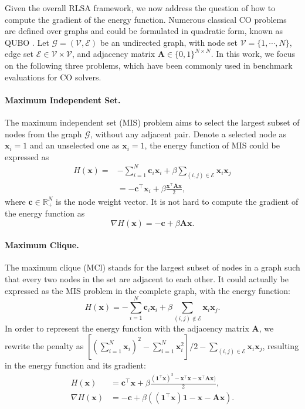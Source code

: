 Given the overall RLSA framework,  we now address the question of how to compute the gradient of the energy function. Numerous classical CO problems are defined over graphs and could be formulated in quadratic form, known as QUBO \citep{10.3389/fphy.2014.00005}. Let $\mathcal{G}=(\mathcal{V}, \mathcal{E})$ be an undirected graph, with node set $\mathcal{V}=\{1,\cdots,N\}$, edge set $\mathcal{E}\in\mathcal{V}\times\mathcal{V}$, and adjacency matrix $\mathbf{A}\in\{0,1\}^{N\times N}$. In this work, we focus on the following three problems, which have been commonly used in benchmark evaluations for CO solvers. 

\paragraph{Maximum Independent Set.}
The maximum independent set (MIS) problem aims to select the largest subset of nodes from the graph $\mathcal{G}$, without any adjacent pair. Denote a selected node as $\mathbf{x}_i=1$ and an unselected one as $\mathbf{x}_i=1$, the energy function of MIS could be expressed as 
\begin{equation}
\begin{split}
        H(\mathbf{x})=&-\sum_{i=1}^N\mathbf{c}_i\mathbf{x}_i+\beta\sum_{(i,j)\in\mathcal{E}}\mathbf{x}_i\mathbf{x}_j\\
    &=-\mathbf{c}^{\top}\mathbf{x}_i + \beta\frac{\mathbf{x}^{\top}\mathbf{A}\mathbf{x}}{2},
\end{split}
\end{equation}
where $\mathbf{c}\in\mathbb{R}_+^N$ is the node weight vector. It is not hard to compute the gradient of the energy function as 
\begin{equation}
    \nabla H(\mathbf{x})=
    -\mathbf{c} + \beta \mathbf{A}\mathbf{x}.
\end{equation}

\paragraph{Maximum Clique.}
The maximum clique (MCl) stands for the largest subset of nodes in a graph such that every two nodes in the set are adjacent to each other. It could actually be expressed as the MIS problem in the complete graph, with the energy function:
\begin{equation}
\label{eq:mis}
 H(\mathbf{x})=-\sum_{i=1}^N\mathbf{c}_i\mathbf{x}_i+\beta\sum_{(i,j)\notin\mathcal{E}}\mathbf{x}_i\mathbf{x}_j.
\end{equation}
In order to represent the energy function with the adjacency matrix $\mathbf{A}$, we rewrite the penalty as $[(\sum_{i=1}^N\mathbf{x}_i)^2-\sum_{i=1}^N\mathbf{x}_i^2]/2-\sum_{(i,j)\in\mathcal{E}}\mathbf{x}_i\mathbf{x}_j$, resulting in the energy function and its gradient:
\begin{align}
H(\mathbf{x})&=\mathbf{c}^{\top}\mathbf{x}+\beta\frac{(\mathbf{1}^{\top}\mathbf{x})^2-\mathbf{x}^{\top}\mathbf{x}-\mathbf{x}^{\top}\mathbf{A}\mathbf{x})}{2},\\    \nabla H(\mathbf{x})&=
-\mathbf{c}+\beta((\mathbf{1}^{\top}\mathbf{x})\mathbf{1}-\mathbf{x}-\mathbf{A}\mathbf{x}).
\end{align}

